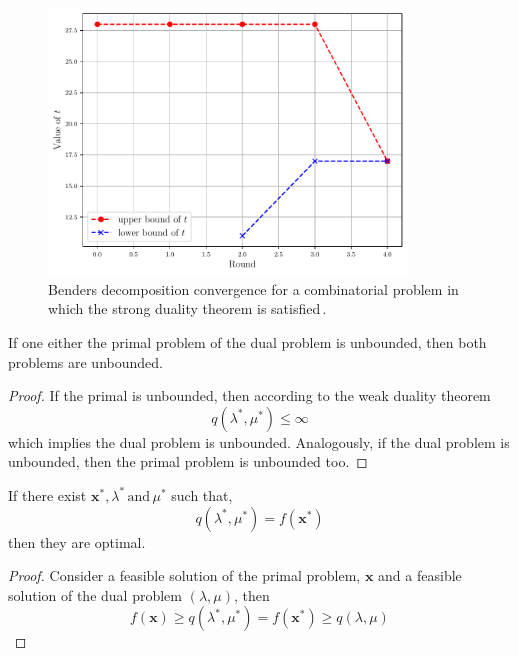 \begin{figure}[H]
\centering
\includegraphics[width=0.85\textwidth]{Figures/BD_Convergence.pdf} 
\caption{Benders decomposition convergence for a combinatorial problem in which the strong duality theorem is satisfied\,\cite{Zhao2021HybridProgramming}.}
\label{fig:BD_Convergence}
\end{figure}
\begin{corollary}{}{}
If one either the primal problem of the dual problem is unbounded, then both problems are unbounded.
\end{corollary}
\begin{proof}
If the primal is unbounded, then according to the weak duality theorem
\begin{equation}
    q(\lambda^{*}, \mu^{*}) \leq \infty
\end{equation}
which implies the dual problem is unbounded. Analogously, if the dual problem is unbounded, then the primal problem is unbounded too.
\end{proof}
\begin{corollary}{}{}
If there exist $\textbf{x}^{*},\lambda^{*}\,\text{and}\, \mu^{*}$ such that,
\begin{equation}
    q(\lambda^{*}, \mu^{*}) = f(\textbf{x}^{*})
\end{equation}
then they are optimal.
\end{corollary}
\begin{proof}
Consider a feasible solution of the primal problem, $\textbf{x}$ and a feasible solution of the dual problem $(\lambda, \mu)$, then
\begin{equation}
    f(\textbf{x}) \geq q(\lambda^{*}, \mu^{*}) = f(\textbf{x}^{*}) \geq q(\lambda, \mu)
\end{equation}
\end{proof}
